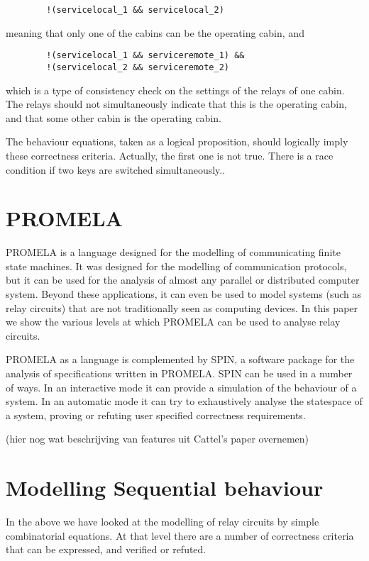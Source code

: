 \begin{verbatim}
        !(servicelocal_1 && servicelocal_2)
\end{verbatim}
meaning that only one of the cabins can be the operating cabin, and

\begin{verbatim}
        !(servicelocal_1 && serviceremote_1) &&
        !(servicelocal_2 && serviceremote_2)
\end{verbatim}
which is a type of consistency check on the settings of the relays of one cabin. The relays should not
simultaneously indicate that this is the operating cabin, and that some other cabin is the
operating cabin.

The behaviour equations, taken as a logical proposition, should logically imply these
correctness criteria.
Actually, the first one is not true. There is a race condition if two keys are switched
simultaneously..


\section{PROMELA}

PROMELA\cite{GH91} is a language designed for the modelling of communicating finite state
machines. It was designed for the modelling of communication protocols, but it can be used for
the analysis of almost any parallel or distributed computer system.
Beyond these applications, it can even be used to model systems (such as relay circuits)
that are not traditionally
seen as computing devices.
In this paper we show the various levels at which PROMELA can be used to analyse relay
circuits.

PROMELA as a language is complemented by SPIN, a software package for the analysis of
specifications written in PROMELA. SPIN can be used in a number of ways. In an interactive
mode it can provide a simulation of the behaviour of a system. In an automatic mode it can try
to exhaustively analyse the statespace of a system, proving or refuting user specified
correctness requirements.

(hier nog wat beschrijving van features uit Cattel's paper overnemen)


\section{Modelling Sequential behaviour}


In the above we have looked at the modelling of relay circuits by simple combinatorial equations.
At that level there are a number of correctness criteria that
can be expressed, and verified or refuted.

